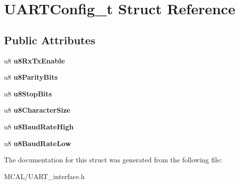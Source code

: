 \hypertarget{struct_u_a_r_t_config__t}{}\section{U\+A\+R\+T\+Config\+\_\+t Struct Reference}
\label{struct_u_a_r_t_config__t}
\subsection*{Public Attributes}
\begin{DoxyCompactItemize}
\item 
\mbox{\label{struct_u_a_r_t_config__t_a0a9fc5ad1b74764ca8b38f0ee0eae70f}} 
u8 {\bfseries u8\+Rx\+Tx\+Enable}
\item 
\mbox{\label{struct_u_a_r_t_config__t_a5e328dee19c3db281559496c68c53866}} 
u8 {\bfseries u8\+Parity\+Bits}
\item 
\mbox{\label{struct_u_a_r_t_config__t_ac04a9b27be9695c5d26502169561001a}} 
u8 {\bfseries u8\+Stop\+Bits}
\item 
\mbox{\label{struct_u_a_r_t_config__t_a530b45131bac2d98406f2e714bf78a43}} 
u8 {\bfseries u8\+Character\+Size}
\item 
\mbox{\label{struct_u_a_r_t_config__t_ad11f4834023da5ea17b72ff34591a553}} 
u8 {\bfseries u8\+Baud\+Rate\+High}
\item 
\mbox{\label{struct_u_a_r_t_config__t_a5c611a8e87bc9ea4746ae016a233ad34}} 
u8 {\bfseries u8\+Baud\+Rate\+Low}
\end{DoxyCompactItemize}


The documentation for this struct was generated from the following file\+:\begin{DoxyCompactItemize}
\item 
M\+C\+A\+L/U\+A\+R\+T\+\_\+interface.\+h\end{DoxyCompactItemize}
